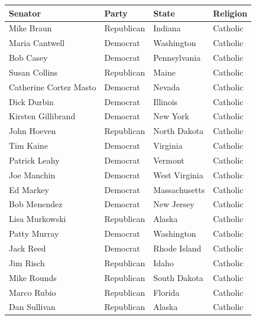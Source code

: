 \documentclass{article}
\begin{document}
\begin{tabular}{llll}
\toprule
Senator & Party & State & Religion \\
\midrule
Mike Braun & Republican & Indiana & Catholic \\
Maria Cantwell & Democrat & Washington & Catholic \\
Bob Casey & Democrat & Pennsylvania & Catholic \\
Susan Collins & Republican & Maine & Catholic \\
Catherine Cortez Masto & Democrat & Nevada & Catholic \\
Dick Durbin & Democrat & Illinois & Catholic \\
Kirsten Gillibrand & Democrat & New York & Catholic \\
John Hoeven & Republican & North Dakota & Catholic \\
Tim Kaine & Democrat & Virginia & Catholic \\
Patrick Leahy & Democrat & Vermont & Catholic \\
Joe Manchin & Democrat & West Virginia & Catholic \\
Ed Markey & Democrat & Massachusetts & Catholic \\
Bob Menendez & Democrat & New Jersey & Catholic \\
Lisa Murkowski & Republican & Alaska & Catholic \\
Patty Murray & Democrat & Washington & Catholic \\
Jack Reed & Democrat & Rhode Island & Catholic \\
Jim Risch & Republican & Idaho & Catholic \\
Mike Rounds & Republican & South Dakota & Catholic \\
Marco Rubio & Republican & Florida & Catholic \\
Dan Sullivan & Republican & Alaska & Catholic \\
\bottomrule
\end{tabular}
\end{document}
